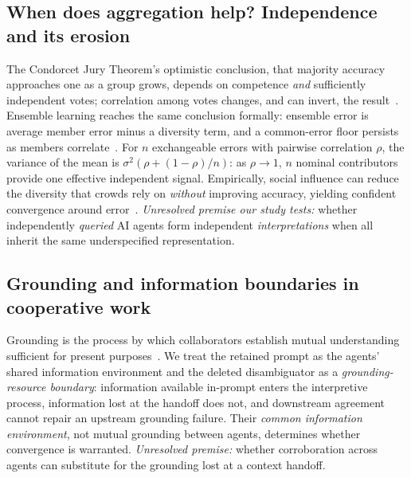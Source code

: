 \documentclass[acmsmall,screen,review,anonymous]{acmart}
\begin{document}
\subsection{When does aggregation help? Independence and its erosion}
The Condorcet Jury Theorem's optimistic conclusion, that majority accuracy approaches one as a group
grows, depends on competence \emph{and} sufficiently independent votes; correlation among votes changes,
and can invert, the result~\cite{condorcet,ladha1992,dietrich2013}. Ensemble learning reaches the same
conclusion formally: ensemble error is average member error minus a diversity term, and a common-error
floor persists as members correlate~\cite{krogh1994,tumer1996}. For $n$ exchangeable errors
with pairwise correlation $\rho$, the variance of the mean is $\sigma^2(\rho + (1-\rho)/n)$: as
$\rho\!\to\!1$, $n$ nominal contributors provide one effective independent signal. Empirically, social
influence can reduce the diversity that crowds rely on \emph{without} improving accuracy, yielding confident
convergence around error~\cite{lorenz2011}. \emph{Unresolved premise our study tests:} whether independently
\emph{queried} AI agents form independent \emph{interpretations} when all inherit the same underspecified
representation.

\subsection{Grounding and information boundaries in cooperative work}
Grounding is the process by which collaborators establish mutual understanding sufficient for present
purposes~\cite{clark1991grounding}. We treat the retained prompt as the agents' shared information
environment and the deleted disambiguator as a \emph{grounding-resource boundary}: information available
in-prompt enters the interpretive process, information lost at the handoff does not, and downstream
agreement cannot repair an upstream grounding failure. Their \emph{common information environment}, not
mutual grounding between agents, determines whether convergence is warranted. \emph{Unresolved premise:} whether corroboration across agents can substitute for
the grounding lost at a context handoff.
\end{document}

